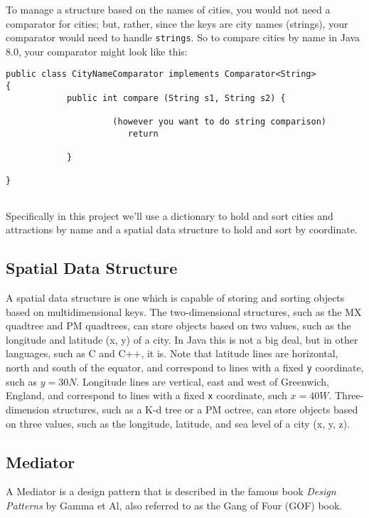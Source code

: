 \documentclass[12pt]{article}
\begin{document}
To manage a structure based on the names of cities,  you would not need a
comparator for cities; but, rather, since the keys  are city names (strings), your
comparator would need to handle \texttt{strings}.
So to compare cities  by name in Java 8.0,  your comparator might look like this:
\begin{verbatim}
public class CityNameComparator implements Comparator<String>
{
            public int compare (String s1, String s2) {
                        
                     (however you want to do string comparison) 
                        return 

            }

}
 
\end{verbatim}


Specifically in this project we'll use a dictionary to hold and
sort cities
and attractions by name and a spatial data structure to hold and sort
by coordinate. 





\subsection{Spatial Data Structure}
A spatial data structure is one which  is capable of storing
and sorting objects based on multidimensional
keys. The two-dimensional
structures, such as the MX quadtree and PM quadtrees, can store objects
based on two values, such as the longitude and latitude (x, y) of a
city. In Java this is not a big deal, but in other languages, such as
C and C++, it is.
 Note that latitude lines are horizontal, north and south of
  the equator, and correspond to lines with a fixed {\tt y} coordinate, such
  as $y=30N$. Longitude lines  are
  vertical, east and west of Greenwich, England, and correspond to lines with a fixed {\tt x} coordinate,
  such $x=40W$.
 Three-dimension structures, such as a K-d tree or a PM octree, can
store objects based on three values, such as the longitude, latitude, and
sea level of a city (x, y, z). 




\subsection{Mediator}
A Mediator is a design pattern that is described in the famous book
\emph{Design} \emph{Patterns}
by Gamma et Al, also referred to as the Gang of Four (GOF) book.\cite{designp}
\end{document}
